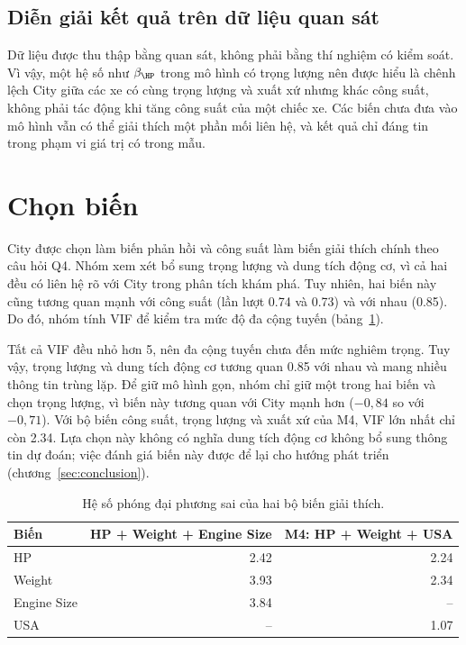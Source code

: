 \documentclass[12pt,a4paper]{report}
\begin{document}
\subsection{Diễn giải kết quả trên dữ liệu quan sát}
\label{sec:observational}

Dữ liệu được thu thập bằng quan sát, không phải bằng thí nghiệm có kiểm soát.
Vì vậy, một hệ số như $\beta_{\HP}$ trong mô hình có trọng lượng nên được hiểu
là chênh lệch City giữa các xe có cùng trọng lượng và xuất xứ nhưng khác công
suất, không phải tác động khi tăng công suất của một chiếc xe. Các biến chưa
đưa vào mô hình vẫn có thể giải thích một phần mối liên hệ, và kết quả chỉ đáng
tin trong phạm vi giá trị có trong mẫu.

\section{Chọn biến}

City được chọn làm biến phản hồi và công suất làm biến giải thích chính theo
câu hỏi Q4. Nhóm xem xét bổ sung trọng lượng và dung tích động cơ, vì cả hai
đều có liên hệ rõ với City trong phân tích khám phá. Tuy nhiên, hai biến này
cũng tương quan mạnh với công suất (lần lượt \num{0.74} và \num{0.73}) và với
nhau (\num{0.85}). Do đó, nhóm tính VIF để kiểm tra mức độ đa cộng tuyến
(bảng~\ref{tab:vif}).

Tất cả VIF đều nhỏ hơn 5, nên đa cộng tuyến chưa đến mức nghiêm trọng. Tuy vậy,
trọng lượng và dung tích động cơ tương quan \num{0.85} với nhau và mang nhiều
thông tin trùng lặp. Để giữ mô hình gọn, nhóm chỉ giữ một trong hai biến và
chọn trọng lượng, vì biến này tương quan với City mạnh hơn ($-0{,}84$ so với
$-0{,}71$). Với bộ biến công suất, trọng lượng và xuất xứ của M4, VIF lớn nhất
chỉ còn \num{2.34}. Lựa chọn này không có nghĩa dung tích động cơ không bổ sung
thông tin dự đoán; việc đánh giá biến này được để lại cho hướng phát triển
(chương~\ref{sec:conclusion}).

\begin{table}[tp]
  \centering
  \caption{Hệ số phóng đại phương sai của hai bộ biến giải thích.}
  \label{tab:vif}
  \begin{tabular}{lrr}
    \toprule
    Biến & HP + Weight + Engine Size & M4: HP + Weight + USA \\
    \midrule
    HP          & \num{2.42} & \num{2.24} \\
    Weight      & \num{3.93} & \num{2.34} \\
    Engine Size & \num{3.84} & -- \\
    USA         & --         & \num{1.07} \\
    \bottomrule
  \end{tabular}
\end{table}
\end{document}
